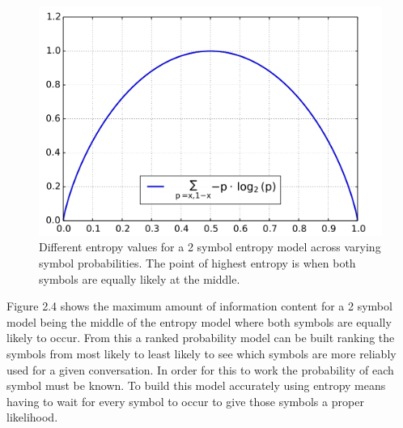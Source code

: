 \begin{figure}[htbp]
\begin{center}
	\includegraphics[scale=0.35]{src/main-matter/theory/fig/entropy_model.png}
\caption{Different entropy values for a 2 symbol entropy model across varying symbol probabilities. The point of highest entropy is when both symbols are equally likely at the middle.}
\label{default}
\end{center}
\end{figure}

Figure 2.4 shows the maximum amount of information content for a 2 symbol model being the middle of the entropy model where both symbols are equally likely to occur. From this a ranked probability model can be built ranking the symbols from most likely to least likely to see which symbols are more reliably used for a given conversation. In order for this to work the probability of each symbol must be known. To build this model accurately using entropy means having to wait for every symbol to occur to give those symbols a proper likelihood. 




